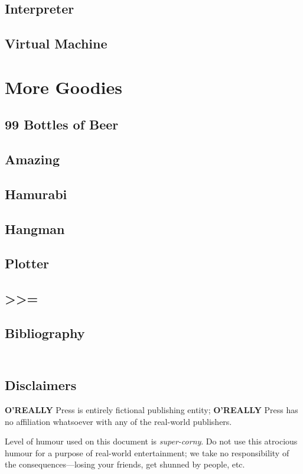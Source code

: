 \documentclass[10pt, stock, openany, chapter]{memoir}
\newcommand\basicmbind{>\hspace*{-0.167em}>\hspace*{-0.167em}=}
\newcommand{\oreallypress}{\begingroup\hspace{0.083em}\large\textbf{O'REALLY\raisebox{1ex}{\scriptsize ?}} \large Press\endgroup}
\begin{document}
\chapter{Interpreter}


\chapter{Virtual Machine}


\part{More Goodies}

\chapter{99 Bottles of Beer}


\chapter{Amazing}


\chapter{Hamurabi}


\chapter{Hangman}


\chapter{Plotter}


\chapter[Proof That Monad Laws Are Obeyed]{\basicmbind}


\chapter{Bibliography}


{
\let\clearpage\relax
\chapter*{\ \\ Disclaimers}

\oreallypress{} is entirely fictional publishing entity; \oreallypress{} has no affiliation whatsoever with any of the real-world publishers.

Level of humour used on this document is \emph{super-corny}. Do not use this atrocious humour for a purpose of real-world entertainment; we take no responsibility of the consequences---losing your friends, get shunned by people, etc.
}
\end{document}
